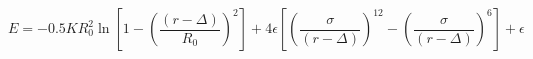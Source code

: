 \documentclass[12pt]{article}
\begin{document}
$$ 
  E = -0.5 K R_0^2
  \ln \left[1 -\left( \frac{\left(r - \Delta\right)}{R_0}\right)^2 \right] + 
  4 \epsilon \left[ \left(\frac{\sigma}{\left(r - 
      \Delta\right)}\right)^{12} - \left(\frac{\sigma}{\left(r - 
      \Delta\right)}\right)^6 \right] + \epsilon
$$
\end{document}
